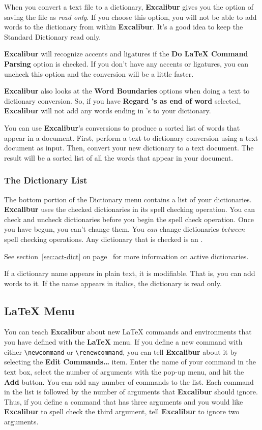 ﻿\documentclass[11pt,titlepage]{article}
\newcommand{\ex}{\textbf{Excalibur}}
\begin{document}
When you convert a text file to a dictionary, \ex{} gives you the
option of saving the file as \emph{read only}.  If you choose this
option, you will not be able to add words to the dictionary from
within \ex.  It's a good idea to keep the Standard Dictionary read
only.

\ex{} will recognize accents and ligatures if the \textbf{Do \LaTeX{}
  Command Parsing} option is checked.  If you don't have any accents
or ligatures, you can uncheck this option and the conversion will be a
little faster.

\ex{} also looks at the \textbf{Word Boundaries} options when doing a
text to dictionary conversion.  So, if you have \textbf{Regard 's as
  end of word} selected, \ex{} will not add any words ending in 's to
your dictionary.

You can use \ex{}'s conversions to produce a sorted list of words that
appear in a document.  First, perform a text to dictionary conversion
using a text document as input.  Then, convert your new dictionary to
a text document.  The result will be a sorted list of all the words
that appear in your document.

\subsubsection{The Dictionary List}

The bottom portion of the Dictionary menu contains a list of your
dictionaries. \ex{} uses the checked dictionaries in its spell
checking operation. You can check and uncheck dictionaries before you
begin the spell check operation. Once you have begun, you can't change
them. You \emph{can} change dictionaries \emph{between} spell checking
operations.  Any dictionary that is checked is an
.
\begin{latexonly}
  See section~\ref{sec:act-dict} on page~\pageref{sec:act-dict} for
  more information on active dictionaries.
\end{latexonly}

If a dictionary name appears in plain text, it is modifiable.  That
is, you can add words to it.  If the name appears in italics, the
dictionary is read only.

\subsection{LaTeX Menu}
\label{sec:latex}

You can teach \ex{} about new \LaTeX{} commands and environments that
you have defined with the \textbf{LaTeX} menu.
If you define a new command with either \verb+\newcommand+ or
\verb+\renewcommand+, you can tell \ex{} about it by selecting the
\textbf{Edit Commands\ldots} item.  Enter the name of your command
in the text box, select the number of arguments with the pop-up menu,
and hit the \textbf{Add} button.  You can add any number of commands
to the list.  Each command in the list is followed by the number of
arguments that \ex{} should ignore.  Thus, if you define a command
that has three arguments and you would like \ex{} to spell check the
third argument, tell \ex{} to ignore two arguments.
\end{document}
